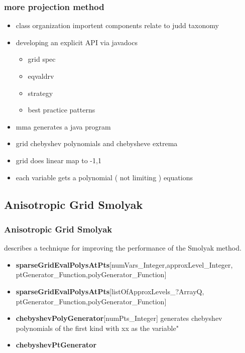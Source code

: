 \documentclass[handout]{beamer}
\begin{document}
\begin{frame}
  \frametitle{more projection method}
  \begin{itemize}
  \item class organization importent components relate to judd taxonomy
  \item developing an explicit API via javadocs
    \begin{itemize}
    \item grid spec
    \item eqvaldrv
    \item strategy
    \item best practice patterns
    \end{itemize}
  \item mma generates a java program
  \item grid chebyshev polynomials and chebysheve extrema
  \item grid does linear map to -1,1
  \item each variable gets a polynomial  ( not limiting )
equations
  \end{itemize}
\end{frame}


\subsection{Anisotropic Grid Smolyak}


\begin{frame}
  \frametitle{Anisotropic Grid Smolyak}
{\small
\cite{Judd2013} describes a technique for improving the performance of
the Smolyak method.
\begin{itemize}
\item {\bf sparseGridEvalPolysAtPts}[numVars\_Integer,approxLevel\_Integer,
ptGenerator\_Function,polyGenerator\_Function] 
\item {\bf sparseGridEvalPolysAtPts}[listOfApproxLevels\_?ArrayQ,
ptGenerator\_Function,polyGenerator\_Function] 
\item {\bf chebyshevPolyGenerator}[numPts\_Integer] generates chebyshev polynomials of the first kind with xx as the variable"
\item {\bf chebyshevPtGenerator}
\end{itemize}
}
\end{frame}

\end{document}
